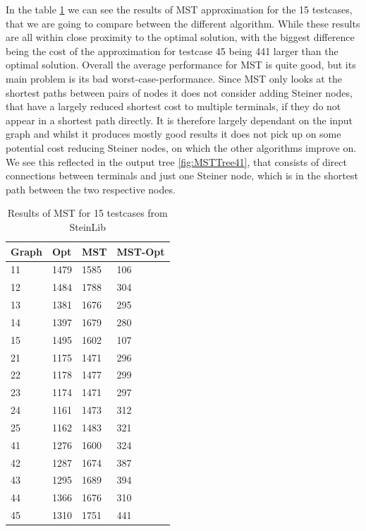 In the table \ref{tab:MSTResults} we can see the results of MST approximation for the 15 testcases, that we are going to compare between the different algorithm. While these results are all within close proximity to the optimal solution, with the biggest difference being the cost of the approximation for testcase 45 being 441 larger than the optimal solution. Overall the average performance for MST is quite good, but its main problem is its bad worst-case-performance. Since MST only looks at the shortest paths between pairs of nodes it does not consider adding Steiner nodes, that have a largely reduced shortest cost to multiple terminals, if they do not appear in a shortest path directly. It is therefore largely dependant on the input graph and whilst it produces mostly good results it does not pick up on some potential cost reducing Steiner nodes, on which the other algorithms improve on. We see this reflected in the output tree \ref{fig:MSTTree41}, that consists of direct connections between terminals and just one Steiner node, which is in the shortest path between the two respective nodes. 
\begin{table}[htbp]
 \caption{Results of MST for 15 testcases from SteinLib \cite{Dui93}}\label{tab:MSTResults} 	
 \centering
 \begin{tabular}{l l l l}
\toprule
Graph & Opt & MST & MST-Opt \\
\midrule
11	& 1479	& 1585		& 106 \\
12	& 1484	& 1788		& 304 \\
13	& 1381	& 1676		& 295 \\
14	& 1397	& 1679		& 280 \\
15	& 1495	& 1602		& 107 \\
\midrule 
21	& 1175	& 1471		& 296 \\
22	& 1178	& 1477		& 299 \\
23	& 1174	& 1471		& 297 \\
24	& 1161	& 1473	 	& 312 \\
25	& 1162	& 1483		& 321 \\
\midrule
41	& 1276	& 1600		& 324 \\
42	& 1287	& 1674		& 387 \\
43	& 1295	& 1689		& 394 \\
44	& 1366	& 1676		& 310 \\
45	& 1310	& 1751		& 441 \\
\bottomrule
\end{tabular}
\end{table}

